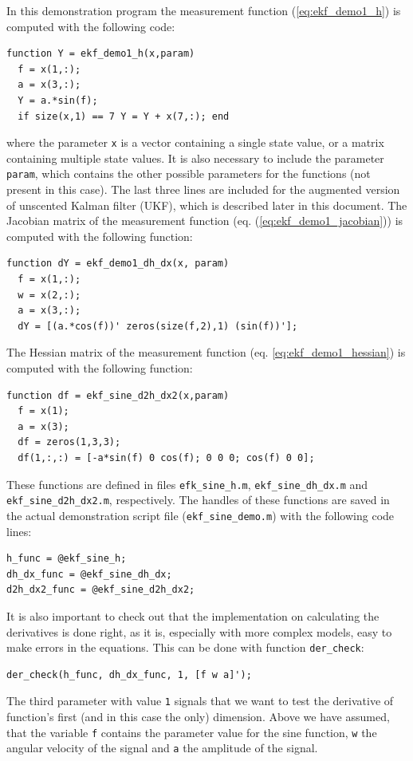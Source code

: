 In this demonstration program the measurement function
(\ref{eq:ekf_demo1_h}) is computed with the following code:
%
\begin{lstlisting} 
function Y = ekf_demo1_h(x,param) 
  f = x(1,:); 
  a = x(3,:); 
  Y = a.*sin(f); 
  if size(x,1) == 7 Y = Y + x(7,:); end
\end{lstlisting}
%
where the parameter \texttt{x} is a vector containing a single state
value, or a matrix containing multiple state values. It is also
necessary to include the parameter \texttt{param}, which contains the
other possible parameters for the functions (not present in this
case). The last three lines are included for the augmented version of
unscented Kalman filter (UKF), which is described later in this
document.  The Jacobian matrix of the measurement function (eq.
(\ref{eq:ekf_demo1_jacobian})) is computed with the following
function:
%
\begin{lstlisting} 
function dY = ekf_demo1_dh_dx(x, param) 
  f = x(1,:); 
  w = x(2,:); 
  a = x(3,:); 
  dY = [(a.*cos(f))' zeros(size(f,2),1) (sin(f))'];
\end{lstlisting}
%
The Hessian matrix of the measurement function (eq.
\ref{eq:ekf_demo1_hessian}) is computed with the following function:
%
\begin{lstlisting} 
function df = ekf_sine_d2h_dx2(x,param) 
  f = x(1); 
  a = x(3);
  df = zeros(1,3,3); 
  df(1,:,:) = [-a*sin(f) 0 cos(f); 0 0 0; cos(f) 0 0];
\end{lstlisting}
% 
These functions are defined in files \texttt{efk\_sine\_h.m},
\texttt{ekf\_sine\_dh\_dx.m} and \texttt{ekf\_sine\_d2h\_dx2.m},
respectively. The handles of these functions are saved in the actual
demonstration script file (\texttt{ekf\_sine\_demo.m}) with the
following code lines:
%
\begin{lstlisting} 
h_func = @ekf_sine_h; 
dh_dx_func = @ekf_sine_dh_dx;
d2h_dx2_func = @ekf_sine_d2h_dx2;
\end{lstlisting}
%

It is also important to check out that the implementation on
calculating the derivatives is done right, as it is, especially with
more complex models, easy to make errors in the equations. This can be
done with function \texttt{der\_check}:
%
\begin{lstlisting} 
der_check(h_func, dh_dx_func, 1, [f w a]');
\end{lstlisting}
%
The third parameter with value \texttt{1} signals that we want to test
the derivative of function's first (and in this case the only)
dimension.  Above we have assumed, that the variable \texttt{f}
contains the parameter value for the sine function, \texttt{w} the
angular velocity of the signal and \texttt{a} the amplitude of the
signal.

